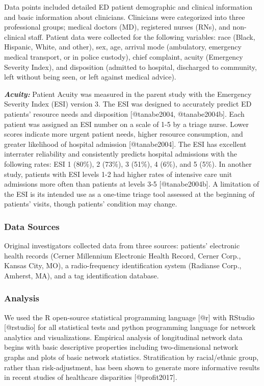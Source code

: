 \documentclass[
]{article}
\begin{document}
Data points included detailed ED patient demographic and clinical
information and basic information about clinicians. Clinicians were
categorized into three professional groups; medical doctors (MD),
registered nurses (RNs), and non-clinical staff. Patient data were
collected for the following variables: race (Black, Hispanic, White, and
other), sex, age, arrival mode (ambulatory, emergency medical transport,
or in police custody), chief complaint, acuity (Emergency Severity
Index), and disposition (admitted to hospital, discharged to community,
left without being seen, or left against medical advice).

\textbf{\emph{Acuity:}} Patient Acuity was measured in the parent study
with the Emergency Severity Index (ESI) version 3. The ESI was designed
to accurately predict ED patients' resource needs and disposition
{[}@tanabe2004, @tanabe2004b{]}. Each patient was assigned an ESI number
on a scale of 1-5 by a triage nurse. Lower scores indicate more urgent
patient needs, higher resource consumption, and greater likelihood of
hospital admission {[}@tanabe2004{]}. The ESI has excellent interrater
reliability and consistently predicts hospital admissions with the
following rates: ESI 1 (80\%), 2 (73\%), 3 (51\%), 4 (6\%), and 5 (5\%).
In another study, patients with ESI levels 1-2 had higher rates of
intensive care unit admissions more often than patients at levels 3-5
{[}@tanabe2004b{]}. A limitation of the ESI is its intended use as a
one-time triage tool assessed at the beginning of patients' visits,
though patients' condition may change.

\hypertarget{data-sources}{%
\subsubsection{Data Sources}\label{data-sources}}

Original investigators collected data from three sources: patients'
electronic health records (Cerner Millennium Electronic Health Record,
Cerner Corp., Kansas City, MO), a radio-frequency identification system
(Radianse Corp., Amherst, MA), and a tag identification database.

\hypertarget{analysis}{%
\subsubsection{Analysis}\label{analysis}}

We used the R open-source statistical programming language {[}@r{]} with
RStudio {[}@rstudio{]} for all statistical tests and python programming
language for network analytics and visualizations. Empirical analysis of
longitudinal network data begins with basic descriptive properties
including two-dimensional network graphs and plots of basic network
statistics. Stratification by racial/ethnic group, rather than
risk-adjustment, has been shown to generate more informative results in
recent studies of healthcare disparities {[}@profit2017{]}.
\end{document}
